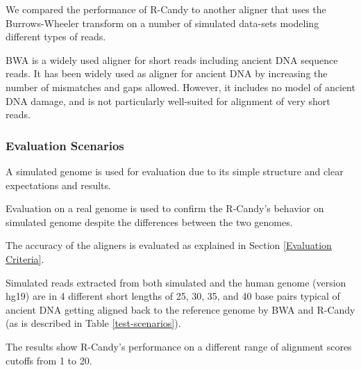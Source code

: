 \documentclass[11pt,a4paper]{report}
\begin{document}
We compared the performance of R-Candy to another aligner that 
uses the Burrows-Wheeler transform\cite{bwa} on a number of simulated 
data-sets modeling different types of reads. 

BWA is a widely used aligner for short reads including ancient
DNA sequence reads.
It has been widely used as aligner for ancient DNA by increasing 
the number of mismatches and gaps allowed.  
However, it includes no model of ancient DNA damage, and is not 
particularly well-suited for alignment of very short reads.




\subsubsection*{Evaluation Scenarios} \label{Evaluation Scenarios}

A simulated genome is used for evaluation due to its simple structure 
and clear expectations and results. 

Evaluation on a real genome is used to confirm the R-Candy's behavior 
on simulated genome despite the differences between the two genomes.

The accuracy of the aligners is evaluated as explained in Section
 \ref{Evaluation Criteria}.

Simulated reads extracted from both simulated and the human genome
(version hg19) are in 4 different short lengths of 25, 30, 35, and 
40 base pairs typical of ancient DNA getting aligned back to the 
reference genome by BWA and R-Candy (as is described in Table 
\ref{test-scenarios}).

The results show R-Candy's performance on a different range of 
alignment scores cutoffs from 1 to 20.
\end{document}
